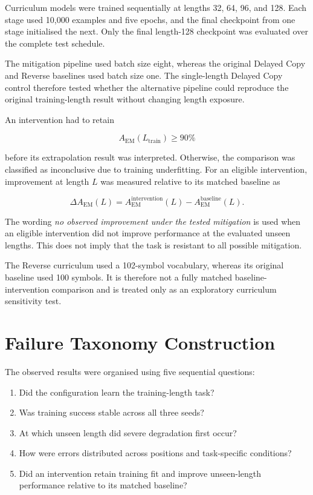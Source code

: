 \documentclass[
    author={Aanchala Ravindra Bhongade},
    supervisor={Dr. Fernando Moreno-Pino},
    degree={MSc},
    title={Length Generalisation in Transformer-Based Sequence Models: Failure Taxonomy and Mitigation Strategies},
    subtitle={},
    type={},
    year={2026}
]{dissertation}
\begin{document}
Curriculum models were trained sequentially at lengths 32, 64, 96, and 128. Each stage used 10,000 examples and five epochs, and the final checkpoint from one stage initialised the next. Only the final length-128 checkpoint was evaluated over the complete test schedule.

The mitigation pipeline used batch size eight, whereas the original Delayed Copy and Reverse baselines used batch size one. The single-length Delayed Copy control therefore tested whether the alternative pipeline could reproduce the original training-length result without changing length exposure.

An intervention had to retain

\[
A_{\mathrm{EM}}(L_{\mathrm{train}})\geq 90\%
\]

before its extrapolation result was interpreted. Otherwise, the comparison was classified as inconclusive due to training underfitting. For an eligible intervention, improvement at length \(L\) was measured relative to its matched baseline as

\begin{equation}
\Delta A_{\mathrm{EM}}(L)
=
A_{\mathrm{EM}}^{\mathrm{intervention}}(L)
-
A_{\mathrm{EM}}^{\mathrm{baseline}}(L).
\label{eq:mitigation-difference}
\end{equation}

The wording \emph{no observed improvement under the tested mitigation} is used when an eligible intervention did not improve performance at the evaluated unseen lengths. This does not imply that the task is resistant to all possible mitigation.

The Reverse curriculum used a 102-symbol vocabulary, whereas its original baseline used 100 symbols. It is therefore not a fully matched baseline-intervention comparison and is treated only as an exploratory curriculum sensitivity test.

\section{Failure Taxonomy Construction}
\label{sec:failure-taxonomy-construction}

The observed results were organised using five sequential questions:

\begin{enumerate}
    \item Did the configuration learn the training-length task?
    \item Was training success stable across all three seeds?
    \item At which unseen length did severe degradation first occur?
    \item How were errors distributed across positions and task-specific conditions?
    \item Did an intervention retain training fit and improve unseen-length performance relative to its matched baseline?
\end{enumerate}
\end{document}
